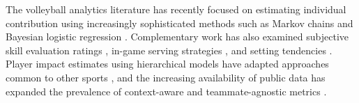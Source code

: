 \documentclass[10pt]{article}
\begin{document}
The volleyball analytics literature has recently focused on estimating individual contribution using increasingly sophisticated methods such as Markov chains and Bayesian logistic regression \citep{miskin_skill_2010, powers_estimating_2025}.
Complementary work has also examined subjective skill evaluation ratings \citep{bagley_bump_2017}, in-game serving strategies \citep{burton_linear_2015}, and setting tendencies \citep{raymond_attack_2024}.
Player impact estimates using hierarchical models have adapted approaches common to other sports \citep{hass_exploring_2018, fellingham_evaluating_2022}, and the increasing availability of public data has expanded the prevalence of context-aware and teammate-agnostic metrics \citep{evollve_glossary_2026}. \\
\end{document}
